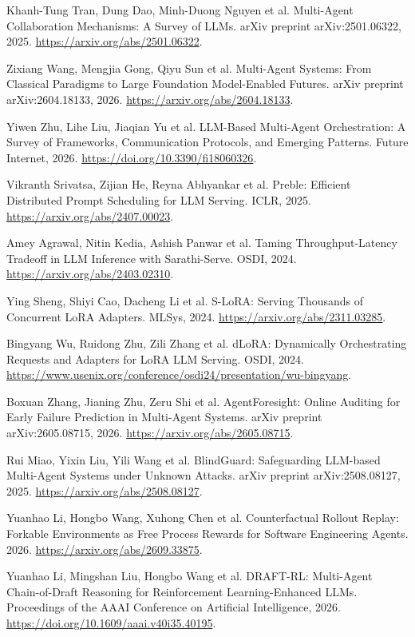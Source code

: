 Khanh-Tung Tran, Dung Dao, Minh-Duong Nguyen et al. Multi-Agent Collaboration Mechanisms: A Survey of {LLM}s. arXiv preprint arXiv:2501.06322, 2025. \url{https://arxiv.org/abs/2501.06322}.

 Zixiang Wang, Mengjia Gong, Qiyu Sun et al. Multi-Agent Systems: From Classical Paradigms to Large Foundation Model-Enabled Futures. arXiv preprint arXiv:2604.18133, 2026. \url{https://arxiv.org/abs/2604.18133}.

 Yiwen Zhu, Lihe Liu, Jiaqian Yu et al. {LLM}-Based Multi-Agent Orchestration: A Survey of Frameworks, Communication Protocols, and Emerging Patterns. Future Internet, 2026. \url{https://doi.org/10.3390/fi18060326}.

 Vikranth Srivatsa, Zijian He, Reyna Abhyankar et al. Preble: Efficient Distributed Prompt Scheduling for {LLM} Serving. ICLR, 2025. \url{https://arxiv.org/abs/2407.00023}.

 Amey Agrawal, Nitin Kedia, Ashish Panwar et al. Taming Throughput-Latency Tradeoff in {LLM} Inference with {Sarathi-Serve}. OSDI, 2024. \url{https://arxiv.org/abs/2403.02310}.

 Ying Sheng, Shiyi Cao, Dacheng Li et al. {S-LoRA}: Serving Thousands of Concurrent {LoRA} Adapters. MLSys, 2024. \url{https://arxiv.org/abs/2311.03285}.

 Bingyang Wu, Ruidong Zhu, Zili Zhang et al. {dLoRA}: Dynamically Orchestrating Requests and Adapters for {LoRA} {LLM} Serving. OSDI, 2024. \url{https://www.usenix.org/conference/osdi24/presentation/wu-bingyang}.

 Boxuan Zhang, Jianing Zhu, Zeru Shi et al. {AgentForesight}: Online Auditing for Early Failure Prediction in Multi-Agent Systems. arXiv preprint arXiv:2605.08715, 2026. \url{https://arxiv.org/abs/2605.08715}.

 Rui Miao, Yixin Liu, Yili Wang et al. {BlindGuard}: Safeguarding {LLM}-based Multi-Agent Systems under Unknown Attacks. arXiv preprint arXiv:2508.08127, 2025. \url{https://arxiv.org/abs/2508.08127}.

 Yuanhao Li, Hongbo Wang, Xuhong Chen et al. {Counterfactual Rollout Replay: Forkable Environments as Free Process Rewards for Software Engineering Agents}. 2026. \url{https://arxiv.org/abs/2609.33875}.

 Yuanhao Li, Mingshan Liu, Hongbo Wang et al. {DRAFT-RL: Multi-Agent Chain-of-Draft Reasoning for Reinforcement Learning-Enhanced LLMs}. Proceedings of the AAAI Conference on Artificial Intelligence, 2026. \url{https://doi.org/10.1609/aaai.v40i35.40195}.

